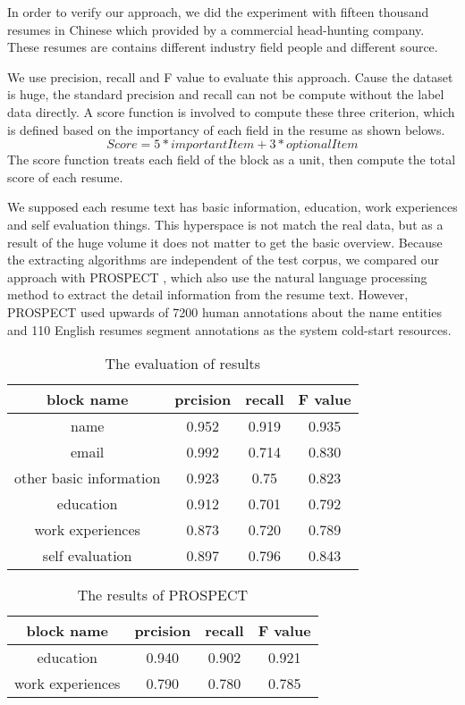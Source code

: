 \documentclass{acm_proc_article-sp}
\begin{document}
In order to verify our approach, we did the experiment with fifteen thousand resumes in Chinese which provided by a commercial head-hunting company. 
These resumes are contains different industry field people and different source.

We use precision, recall and F value to evaluate this approach.
Cause the dataset is huge, the standard precision and recall can not be compute without the label data directly.
A score function is involved to compute these three criterion, which is defined based on the importancy of each field in the resume as shown belows.
$$Score = 5 * importantItem + 3 * optionalItem$$
The score function treats each field of the block as a unit, then compute the total score of each resume.

We supposed each resume text has basic information, education, work experiences and self evaluation things.
This hyperspace is not match the real data, but as a result of the huge volume it does not matter to get the basic overview.
Because the extracting algorithms are independent of the test corpus, we compared our approach with PROSPECT \cite{Singh:2010:PSS:1871437.1871523}, which also use the natural language processing method to extract the detail information from the resume text.
However, PROSPECT used upwards of 7200 human annotations about the name entities and 110 English resumes segment annotations as the system cold-start resources.

\begin{table}\label{p-r-f}
\centering
\caption{The evaluation of results}
\begin{tabular}{|c|c|c|c|} \hline
block name & prcision & recall & F value\\ \hline
name & 0.952 & 0.919 & 0.935 \\ \hline
email & 0.992 & 0.714 &0.830 \\  \hline
other basic information & 0.923 & 0.75 & 0.823 \\ \hline
education & 0.912 & 0.701 & 0.792\\ \hline
work experiences & 0.873  & 0.720 & 0.789 \\ \hline
self evaluation & 0.897  &0.796 &0.843 \\
\hline\end{tabular}
\end{table}

\begin{table}\label{prospect}
\centering
\caption{The results of PROSPECT}
\begin{tabular}{|c|c|c|c|} \hline
block name  & prcision & recall & F value\\ \hline
education & 0.940 & 0.902 & 0.921 \\ \hline
work experiences & 0.790 & 0.780 & 0.785 \\ \hline
\end{tabular}
\end{table}
\end{document}
